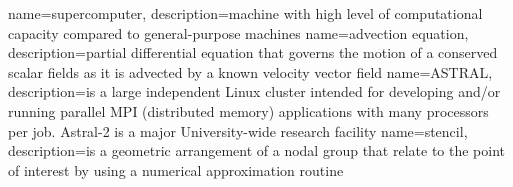 

{
	name={supercomputer},
	description={machine with high level of computational capacity compared to general-purpose machines}
}
{
	name={advection equation},
	description={partial differential equation that governs the motion of a conserved scalar fields as it is advected by a known velocity vector field \cite{bib:advection}}
}
{
	name={ASTRAL},
	description={is a large independent Linux cluster intended for developing and/or running parallel \gls{MPI} (distributed memory) applications with many processors per job. Astral-2 is a major University-wide research facility \cite{bib:astral}}
}
{
	name={stencil},
	description={is a geometric arrangement of a nodal group that relate to the point of interest by using a numerical approximation routine \cite{bib:stencil}}
}